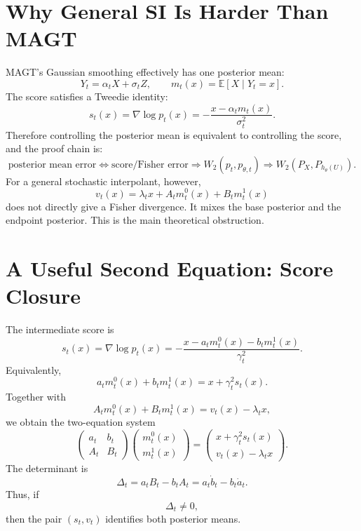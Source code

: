 \documentclass[11pt]{article}
\newcommand{\E}{\mathbb{E}}
\theoremstyle{plain}
\theoremstyle{definition}
\begin{document}
\section{Why General SI Is Harder Than MAGT}

MAGT's Gaussian smoothing effectively has one posterior mean:
\begin{equation}
Y_t=\alpha_tX+\sigma_tZ,
\qquad
m_t(x)=\E[X\mid Y_t=x].
\end{equation}
The score satisfies a Tweedie identity:
\begin{equation}
s_t(x)
=
\nabla\log p_t(x)
=
-\frac{x-\alpha_t m_t(x)}{\sigma_t^2}.
\end{equation}
Therefore controlling the posterior mean is equivalent to controlling the score,
and the proof chain is:
\begin{equation}
\text{posterior mean error}
\Longleftrightarrow
\text{score/Fisher error}
\Longrightarrow
W_2(p_t,p_{\theta,t})
\Longrightarrow
W_2(P_X,P_{h_\theta(U)}).
\end{equation}
For a general stochastic interpolant, however,
\begin{equation}
v_t(x)
=
\lambda_t x+A_t m_t^0(x)+B_t m_t^1(x)
\end{equation}
does not directly give a Fisher divergence. It mixes the base posterior and the
endpoint posterior. This is the main theoretical obstruction.

\section{A Useful Second Equation: Score Closure}

The intermediate score is
\begin{equation}
s_t(x)
=
\nabla\log p_t(x)
=
-\frac{
x-a_t m_t^0(x)-b_t m_t^1(x)
}{
\gamma_t^2
}.
\end{equation}
Equivalently,
\begin{equation}
a_t m_t^0(x)+b_t m_t^1(x)
=
x+\gamma_t^2 s_t(x).
\end{equation}
Together with
\begin{equation}
A_t m_t^0(x)+B_t m_t^1(x)
=
v_t(x)-\lambda_t x,
\end{equation}
we obtain the two-equation system
\begin{equation}
\begin{pmatrix}
a_t & b_t\\
A_t & B_t
\end{pmatrix}
\begin{pmatrix}
m_t^0(x)\\
m_t^1(x)
\end{pmatrix}
=
\begin{pmatrix}
x+\gamma_t^2s_t(x)\\
v_t(x)-\lambda_t x
\end{pmatrix}.
\end{equation}
The determinant is
\begin{equation}
\Delta_t
=
a_tB_t-b_tA_t
=
a_t\dot b_t-b_t\dot a_t.
\end{equation}
Thus, if
\begin{equation}
\Delta_t\ne0,
\end{equation}
then the pair \((s_t,v_t)\) identifies both posterior means.
\end{document}
